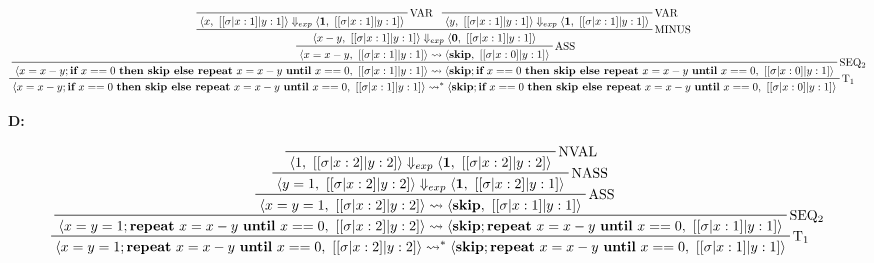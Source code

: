 \documentclass[11pt]{article}
\newcommand{\curly}{\mathrel{\leadsto}}
\begin{document}
\begin{landscape}
\begin{displaymath}
    \prftree[r]{$\mathrm{T_1}$}{
        \prftree[r]{$\mathrm{SEQ_2}$}{
            \prftree[r]{$\mathrm{ASS}$}{
                \prftree[r]{$\mathrm{MINUS}$}{
                    \prftree[r]{$\mathrm{VAR}$}
                    {\langle x,\ [[\sigma|x:1]|y:1] \rangle \Downarrow_{exp} \langle \textbf{1},\ [[\sigma|x:1]|y:1] \rangle}
                }{
                    \prftree[r]{$\mathrm{VAR}$}
                    {\langle y,\ [[\sigma|x:1]|y:1] \rangle \Downarrow_{exp} \langle \textbf{1},\ [[\sigma|x:1]|y:1] \rangle}  
                }
                {\langle x-y,\ [[\sigma|x:1]|y:1] \rangle \Downarrow_{exp} \langle \textbf{0},\ [[\sigma|x:1]|y:1] \rangle}
            }
            {\langle x=x-y,\ [[\sigma|x:1]|y:1] \rangle \curly \langle \textbf{skip},\ [[\sigma|x:0]|y:1] \rangle}
        }
        {\langle x=x-y; \textbf{if}\ x==0\ \textbf{then\ skip\ else\ repeat}\ x=x-y\ \textbf{until}\ x==0,\ [[\sigma|x:1]|y:1] \rangle \curly \langle \textbf{skip}; \textbf{if}\ x==0\ \textbf{then\ skip\ else\ repeat}\ x=x-y\ \textbf{until}\ x==0,\ [[\sigma|x:0]|y:1] \rangle}
    }
    {\langle x=x-y; \textbf{if}\ x==0\ \textbf{then\ skip\ else\ repeat}\ x=x-y\ \textbf{until}\ x==0,\ [[\sigma|x:1]|y:1] \rangle \curly^* \langle \textbf{skip}; \textbf{if}\ x==0\ \textbf{then\ skip\ else\ repeat}\ x=x-y\ \textbf{until}\ x==0,\ [[\sigma|x:0]|y:1] \rangle}
\end{displaymath}

\textbf{D:}

\begin{displaymath}
    \prftree[r]{$\mathrm{T_1}$}{
        \prftree[r]{$\mathrm{SEQ_2}$}{
            \prftree[r]{$\mathrm{ASS}$}{
                \prftree[r]{$\mathrm{NASS}$}{
                    \prftree[r]{$\mathrm{NVAL}$}
                    {\langle 1,\ [[\sigma|x:2]|y:2] \rangle \Downarrow_{exp} \langle \textbf{1} ,\ [[\sigma|x:2]|y:2] \rangle}
                }
                {\langle y=1,\ [[\sigma|x:2]|y:2] \rangle \Downarrow_{exp} \langle \textbf{1} ,\ [[\sigma|x:2]|y:1] \rangle}
            }
            {\langle x=y=1,\ [[\sigma|x:2]|y:2] \rangle \curly \langle \textbf{skip} ,\ [[\sigma|x:1]|y:1] \rangle}
        }
        {\langle x=y=1; \textbf{repeat}\ x=x-y\ \textbf{until}\ x==0,\ [[\sigma|x:2]|y:2] \rangle \curly \langle \textbf{skip}; \textbf{repeat}\ x=x-y\ \textbf{until}\ x==0,\ [[\sigma|x:1]|y:1] \rangle}
    }
    {\langle x=y=1; \textbf{repeat}\ x=x-y\ \textbf{until}\ x==0,\ [[\sigma|x:2]|y:2] \rangle \curly^* \langle \textbf{skip}; \textbf{repeat}\ x=x-y\ \textbf{until}\ x==0,\ [[\sigma|x:1]|y:1] \rangle}
\end{displaymath}


\end{landscape}
\end{document}

